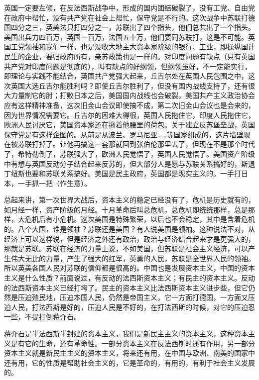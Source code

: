 英国一定要左倾，在反法西斯战争中，形成的国内团结破裂了，没有工党、自由党在政府中帮忙，没有共产党在社会上帮忙，保守党是不行的。这次战争中苏联打德国四分之三，英美法只打四分之一，苏联出了四个指头，他们总共出了一个指头。美国出兵力四百万，英国一百万，法国五十万，他们要同苏联打，这是不可能。英国工党领袖和我们一样，也是没收大地主大资本家阶级的银行、工业，即操纵国计民生的企业，要归政府所有，亲苏政策也是一样的。对印度问题有缺点（只有英国共产党对印度问题是彻底的），叫有缺点的好纲领，但纲领虽好，不一定能实行，即理论与实践不能结合，英国共产党强大起来，丘吉尔处在英国人民包围之中，这次英国大选丘吉尔能胜利吗？即使丘吉尔胜利了，但没有国内战线支持了，还有很大力量制它的肘；打败日本之后，美国国内战线也会破裂，美国共产主义政治协会应有这样精神准备，这次旧金山会议即使搞不成，第二次旧金山会议也是会来的，因为世界情况需要它。丘吉尔的困难大得很，英国人民拖住它，印度人民拖住它，欧洲人民讨厌它，美国资本家还在揪着他腰里的荷包。关于建立反苏堡垒战，英国保守党是有这样企图的。从前是从波兰、罗马尼亚……等国家组成的，这片墙壁现在被苏联打掉了。让他再搞这一套那就回到张伯伦那里去了，但现在不是那个时代了，希特勒倒了，苏联强大了，欧洲人民觉悟了，英国人民觉悟了。美国资产阶级中有想与英国反动分子结合起来反苏的，但大部分人是愿与苏联关系搞好的，斯退丁纽斯也要和苏联关系搞好。美国是民主政府，英国都是现实主义的。一手打日本，一手抓一把（作生意）。

总起来讲，第一次世界大战后，资本主义的稳定已经没有了，危机是历史就有的，如月经一样，资产阶级的月经。十月革命后叫总危机，总危机即统统那样，总是那样，大危机后有小危机。这次美国是特殊繁荣，以后也不会稳定，其中是含着危机的。八个大国，谁是领袖？苏联还是美国？有人说美国是领袖。这种说法不对，从经济上可以这样说，但是经济之外还有政治，政治与经济结合起来才是更强大的，那就是苏联。苏联在经济的力量上说，不如美国，但苏联是社会主义经济，可以产生伟大无比的力量，产生了强大的红军，英勇的人民，苏联是全世界人民的领袖。所以英美各国人民对苏联的信仰都是很高的。中国也是发展资本主义，中国的资本主义是什么性质？前面说过，有反动的法西斯资本主义；有民主的资本主义。反动的法西斯资本主义已经打垮了。民主的资本主义比法西斯资本主义进步些，但它仍然是压迫殖民地，压迫本国人民，仍然是帝国主义，它一方面打德国，一方面又压迫人民，打法西斯是好的，压迫人民是不好的，在打法西斯的时候，对它的压迫忍一些，不提打倒蒋介石。

蒋介石是半法西斯半封建的资本主义，我们是新民主主义的资本主义，这种资本主义是有它的生命，还有革命性。一部分资本主义在反法西斯时还有作用，另一部分资本主义就是新民主主义的资本主义，将来还有用，在中国与欧洲、南美的国家中还有用，它的性质是帮助社会主义的，它是革命的，有用的，有利于社会主义发展的。

